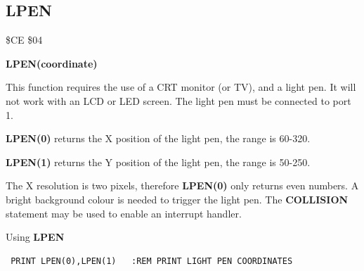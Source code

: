 \subsection{LPEN}
\begin{description}[leftmargin=2cm,style=nextline]
\item [Token:] \$CE \$04
\item [Format:] {\bf LPEN(coordinate)}
\item [Usage:] This function requires the use of a
               CRT monitor (or TV), and a light pen.
               It will not work with an LCD or LED screen.
               The light pen must be connected to port 1.

               {\bf LPEN(0)} returns the X position of the light pen,
               the range is 60-320.

               {\bf LPEN(1)} returns the Y position of the light pen,
               the range is 50-250.

\item [Remarks:] The X resolution is two pixels, therefore {\bf LPEN(0)} only
                 returns even numbers.
                 A bright background colour is needed to trigger
                 the light pen. The {\bf COLLISION} statement may
                 be used to enable an interrupt handler.

\item [Example:] Using {\bf LPEN}
\begin{tcolorbox}[colback=black,coltext=white]
\verbatimfont{\codefont}
\begin{verbatim}
 PRINT LPEN(0),LPEN(1)   :REM PRINT LIGHT PEN COORDINATES
\end{verbatim}
\end{tcolorbox}
\end{description}


\newpage
